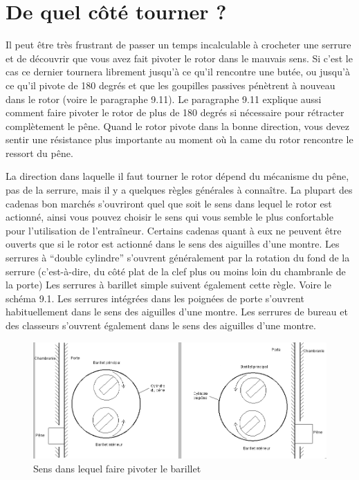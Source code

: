 \documentclass[a4paper,french,11pt,twoside]{report}
\begin{document}
\section{De quel côté tourner ?}

Il peut être très frustrant de passer un temps incalculable à crocheter une serrure et de découvrir que vous avez fait pivoter le rotor dans le mauvais sens. Si c'est le cas ce dernier tournera librement jusqu'à ce qu'il rencontre une butée, ou jusqu'à ce qu'il pivote de 180 degrés et que les goupilles passives pénètrent à nouveau dans le rotor (voire le paragraphe 9.11). Le paragraphe 9.11 explique aussi comment faire pivoter le rotor de plus de 180 degrés si nécessaire pour rétracter complètement le pêne. Quand le rotor pivote dans la bonne direction, vous devez sentir une résistance plus importante au moment où la came du rotor rencontre le ressort du pêne.

La direction dans laquelle il faut tourner le rotor dépend du mécanisme du pêne, pas de la serrure, mais il y a quelques règles générales à connaître. La plupart des cadenas bon marchés s'ouvriront quel que soit le sens dans lequel le rotor est actionné, ainsi vous pouvez choisir le sens qui vous semble le plus confortable pour l'utilisation de l'entraîneur. Certains cadenas quant à eux ne peuvent être ouverts que si le rotor est actionné dans le sens des aiguilles d'une montre. Les serrures à \enquote{double cylindre} s'ouvrent généralement par la rotation du fond de la serrure (c'est-à-dire, du côté plat de la clef plus ou moins loin du chambranle de la porte) Les serrures à barillet simple suivent également cette règle. Voire le schéma 9.1. Les serrures intégrées dans les poignées de porte s'ouvrent habituellement dans le sens des aiguilles d'une montre. Les serrures de bureau et des classeurs s'ouvrent également dans le sens des aiguilles d'une montre.


\begin{figure}[h] \begin{center}
        \includegraphics[width=16cm]{images/Image16_17.png}
        \caption{Sens dans lequel faire pivoter le barillet}
\end{center} \end{figure}
\end{document}
